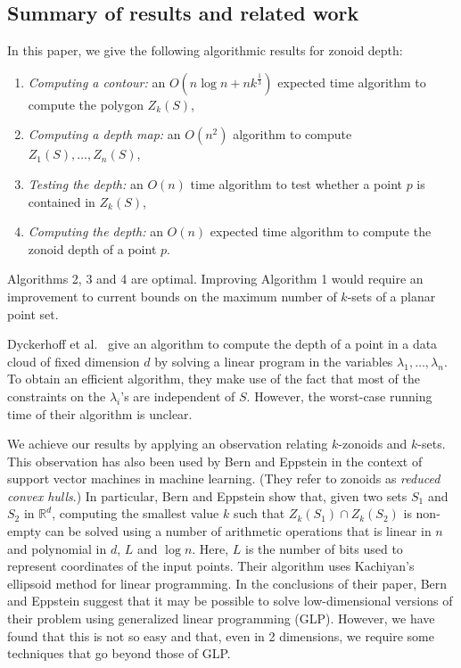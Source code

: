 \documentclass{elsart}
\begin{document}
\subsection{Summary of results and related work}
\label{subsection_summary_of_results}

In this paper, we give the following algorithmic results for zonoid
depth:

\begin{enumerate}

\item\emph{Computing a contour:} an $O(n \log n + nk^{\frac{1}{3}})$
expected time algorithm to compute the polygon $Z_k(S)$,

\item\emph{Computing a depth map:} an $O(n^2)$ algorithm to compute
$Z_1(S),\ldots,Z_n(S)$,

\item\emph{Testing the depth:} an $O(n)$ time algorithm to test whether a
point $p$ is contained in $Z_k(S)$,

\item\emph{Computing the depth:} an $O(n)$ expected time algorithm to
compute the zonoid depth of a point $p$.

\end{enumerate}

Algorithms 2, 3 and 4 are optimal. Improving Algorithm 1 would require an
improvement to current bounds on the maximum number of $k$-sets
of a planar point set.

Dyckerhoff et al.\ \cite{zonoid_data_depth_theory_and_computation}
give an algorithm to compute the depth of a point in a data cloud of
fixed dimension $d$ by solving a linear program in the variables
$\lambda_1,\ldots, \lambda_n$. To obtain an efficient algorithm, they
make use of the fact that most of the constraints on the $\lambda_i$'s
are independent of $S$. However, the worst-case running time of their
algorithm is unclear. 

We achieve our results by applying an observation relating $k$-zonoids
and $k$-sets.  This observation has also been used by Bern and
Eppstein \cite{bern-eppstein-01} in the context of support vector
machines in machine learning.  (They refer to zonoids as \emph{reduced
convex hulls}.) In particular, Bern and Eppstein show that, given two
sets $S_1$ and $S_2$ in $\mathbb{R}^d$, computing the smallest value
$k$ such that $Z_k(S_1)\cap Z_k(S_2)$ is non-empty can be solved using
a number of arithmetic operations that is linear in $n$ and polynomial
in $d$, $L$ and $\log n$.  Here, $L$ is the number of bits used to
represent coordinates of the input points.  Their algorithm uses
Kachiyan's ellipsoid method \cite{k79} for linear programming.  In the
conclusions of their paper, Bern and Eppstein suggest that it may be
possible to solve low-dimensional versions of their problem using
generalized linear programming (GLP).  However, we have found that
this is not so easy and that, even in 2 dimensions, we require some
techniques that go beyond those of GLP.
\end{document}
